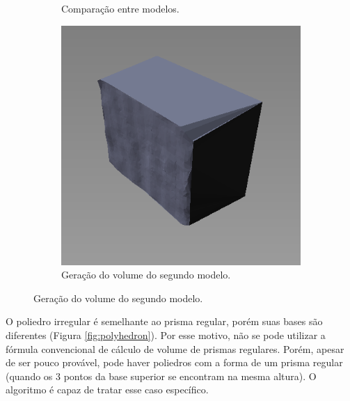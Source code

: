 \begin{figure}[H]
\begin{subfigure}[t]{0.325\textwidth}
        \caption{Comparação entre modelos.}
        \label{fig:projection2}
    \end{subfigure}
    \begin{subfigure}[t]{0.325\textwidth}
        \includegraphics[width=\textwidth]{dados/figuras/projection3.png}
        \caption{Geração do volume do segundo modelo.}
        \label{fig:projection3}
    \end{subfigure}
    \label{fig:projection}
\end{figure}

O poliedro irregular é semelhante ao prisma regular, porém suas bases são diferentes (Figura \ref{fig:polyhedron}). Por esse motivo, não se pode utilizar a fórmula convencional de cálculo de volume de prismas regulares.  
Porém, apesar de ser pouco provável, pode haver poliedros com a forma de um prisma regular (quando os 3 pontos da base superior se encontram na mesma altura). 
O algoritmo é capaz de tratar esse caso específico.

